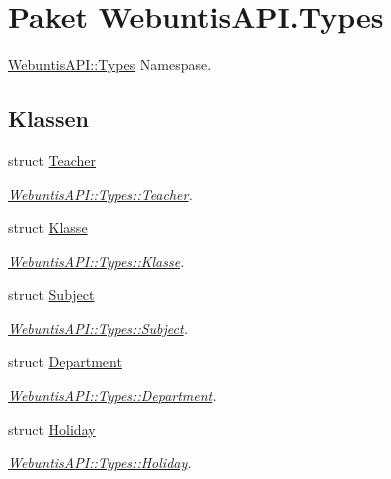 \hypertarget{namespace_webuntis_a_p_i_1_1_types}{\section{Paket Webuntis\-A\-P\-I.\-Types}
\label{namespace_webuntis_a_p_i_1_1_types}
}


\hyperlink{namespace_webuntis_a_p_i_1_1_types}{Webuntis\-A\-P\-I\-::\-Types} Namespase.  


\subsection*{Klassen}
\begin{DoxyCompactItemize}
\item 
struct \hyperlink{struct_webuntis_a_p_i_1_1_types_1_1_teacher}{Teacher}
\begin{DoxyCompactList}\small\item\em \hyperlink{struct_webuntis_a_p_i_1_1_types_1_1_teacher}{Webuntis\-A\-P\-I\-::\-Types\-::\-Teacher}. \end{DoxyCompactList}\item 
struct \hyperlink{struct_webuntis_a_p_i_1_1_types_1_1_klasse}{Klasse}
\begin{DoxyCompactList}\small\item\em \hyperlink{struct_webuntis_a_p_i_1_1_types_1_1_klasse}{Webuntis\-A\-P\-I\-::\-Types\-::\-Klasse}. \end{DoxyCompactList}\item 
struct \hyperlink{struct_webuntis_a_p_i_1_1_types_1_1_subject}{Subject}
\begin{DoxyCompactList}\small\item\em \hyperlink{struct_webuntis_a_p_i_1_1_types_1_1_subject}{Webuntis\-A\-P\-I\-::\-Types\-::\-Subject}. \end{DoxyCompactList}\item 
struct \hyperlink{struct_webuntis_a_p_i_1_1_types_1_1_department}{Department}
\begin{DoxyCompactList}\small\item\em \hyperlink{struct_webuntis_a_p_i_1_1_types_1_1_department}{Webuntis\-A\-P\-I\-::\-Types\-::\-Department}. \end{DoxyCompactList}\item 
struct \hyperlink{struct_webuntis_a_p_i_1_1_types_1_1_holiday}{Holiday}
\begin{DoxyCompactList}\small\item\em \hyperlink{struct_webuntis_a_p_i_1_1_types_1_1_holiday}{Webuntis\-A\-P\-I\-::\-Types\-::\-Holiday}. \end{DoxyCompactList}\item 

\end{DoxyCompactItemize}
